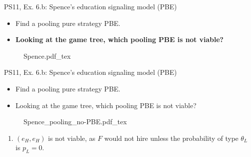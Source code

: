 \begin{frame}{PS11, Ex. 6.b: Spence’s education signaling model (PBE)}
    \begin{multicols}{2}
      \begin{itemize}
        \item[(b)] Find a pooling pure strategy PBE.
        \item[Step 1:] \textbf{Looking at the game tree, which pooling PBE is not viable?}
      \end{itemize}\vspace{-6pt}
      \vfill\null\columnbreak
      \begin{figure}[!h]
        \center
        \def\svgwidth{1.1\columnwidth}
        {Spence.pdf_tex}
      \end{figure}\vspace{-4pt}
      \vfill\null
    \end{multicols}
\end{frame}
\begin{frame}{PS11, Ex. 6.b: Spence’s education signaling model (PBE)}
    \begin{multicols}{2}
      \begin{itemize}
        \item[(b)] Find a pooling pure strategy PBE.
        \item[Step 1:] Looking at the game tree, which pooling PBE is not viable?
      \end{itemize}\vspace{-6pt}
      \vfill\null\columnbreak
      \begin{figure}[!h]
        \center{}
        {Spence_pooling_no-PBE.pdf_tex}
      \end{figure}\vspace{-6pt}
      \begin{enumerate}
        \item $(e_H,e_H)$ is not viable, as $F$ would not hire unless the probability of type $\theta_L$ is $p_L=0$.
      \end{enumerate}
      \vfill\null
    \end{multicols}
\end{frame}
